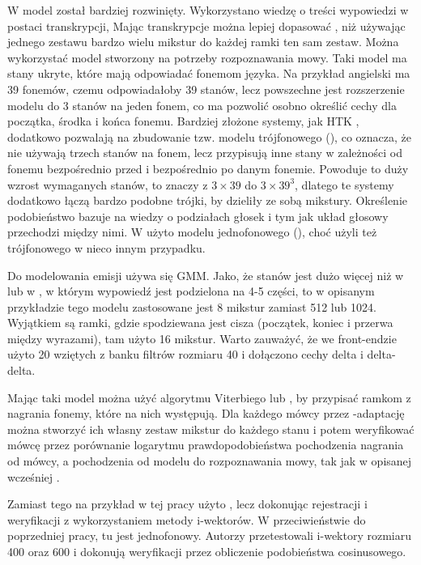 W 
model  został bardziej rozwinięty. Wykorzystano wiedzę o treści wypowiedzi w postaci transkrypcji,
Mając transkrypcje można lepiej dopasować , niż używając jednego zestawu bardzo wielu mikstur 
do każdej ramki ten sam zestaw.
Można wykorzystać model stworzony na potrzeby rozpoznawania mowy.
Taki model ma stany ukryte, które mają odpowiadać fonemom języka. Na przykład angielski ma 39 fonemów, czemu odpowiadałoby 39 stanów, lecz powszechne jest rozszerzenie
modelu do 3 stanów na jeden fonem, co ma pozwolić osobno określić cechy dla początka, środka i końca fonemu. 
Bardziej złożone systemy, jak HTK
, dodatkowo pozwalają na zbudowanie tzw. modelu trójfonowego (), co oznacza, że nie używają trzech stanów na fonem, lecz
przypisują inne stany w zależności od fonemu bezpośrednio przed i bezpośrednio po danym fonemie. Powoduje to duży wzrost wymaganych stanów, to znaczy z $3 \times 39$ do $3 \times 39^3$,
dlatego te systemy dodatkowo łączą bardzo podobne trójki, by dzieliły ze sobą mikstury. Określenie podobieństwo bazuje na wiedzy o podziałach głosek i tym jak układ głosowy przechodzi między nimi.
W 
użyto modelu jednofonowego (), choć użyli też trójfonowego w nieco innym przypadku. 

Do modelowania emisji używa się GMM. Jako, że stanów jest dużo więcej niż w  lub w , w którym wypowiedź jest podzielona na 4-5 części, to
w opisanym przykładzie tego modelu zastosowane jest 8 mikstur zamiast 512 lub 1024. Wyjątkiem są ramki, gdzie spodziewana jest cisza (początek, koniec i przerwa między wyrazami), tam
użyto 16 mikstur. Warto zauważyć, że we front-endzie użyto 20  wziętych z banku filtrów rozmiaru 40 i dołączono cechy delta i delta-delta.

Mając taki model można użyć algorytmu Viterbiego lub , by przypisać ramkom z nagrania fonemy, które na nich występują. Dla każdego mówcy
przez -adaptację można stworzyć ich własny zestaw mikstur do każdego stanu i potem weryfikować mówcę przez porównanie logarytmu prawdopodobieństwa
pochodzenia nagrania od mówcy, a pochodzenia od modelu do rozpoznawania mowy, tak jak w opisanej wcześniej . 

Zamiast tego na przykład w tej pracy
użyto , lecz dokonując rejestracji i weryfikacji z wykorzystaniem metody i-wektorów. W przeciwieństwie do poprzedniej pracy, tu  jest jednofonowy. Autorzy przetestowali
i-wektory rozmiaru 400 oraz 600 i dokonują weryfikacji przez obliczenie podobieństwa cosinusowego.

